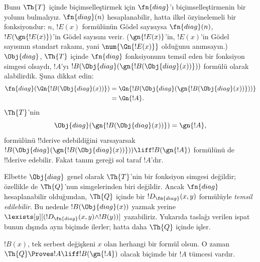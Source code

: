 \begin{explain}
Bunu $\Th{T}$ içinde biçimselleştirmek için $\fn{diag}$'ı
biçimselleştirmenin bir yolunu bulmalıyız. $\fn{diag}(n)$ hesaplanabilir,
hatta ilkel özyinelemeli bir fonksiyondur: $n$, $!E(x)$ formülünün G\"odel
sayısıysa $\fn{diag}(n)$, $!E(\gn{!E(x)})$'in G\"odel sayısını verir.
($\gn{!E(x)}$'in, $!E(x)$'in G\"odel sayısının standart rakamı, yani
$\num{\Gn{!E(x)}}$ olduğunu anımsayın.) $\Obj{diag}$, $\Th{T}$ içinde
$\fn{diag}$ fonksiyonunu temsil eden bir fonksiyon simgesi olsaydı, $!A$'yı
$!B(\Obj{diag}(\gn{!B(\Obj{diag}(x))}))$ formülü olarak alabilirdik. Şuna
dikkat edin:
\begin{align*}
\fn{diag}(\Gn{!B(\Obj{diag}(x))}) & = 
\Gn{!B(\Obj{diag}(\gn{!B(\Obj{diag}(x))}))} \\
& = \Gn{!A}.
\end{align*}
$\Th{T}$'nin
\[
\Obj{diag}(\gn{!B(\Obj{diag}(x))}) = \gn{!A},
\]
formülünü !!{derive} edebildiğini varsayarsak
$!B(\Obj{diag}(\gn{!B(\Obj{diag}(x))})) \liff !B(\gn{!A})$ formülünü de
!!{derive} edebilir. Fakat tanım gereği sol taraf $!A$'dır.

Elbette $\Obj{diag}$ genel olarak $\Th{T}$'nin bir fonksiyon simgesi değildir;
özellikle de $\Th{Q}$'nun simgelerinden biri değildir. Ancak $\fn{diag}$
hesaplanabilir olduğundan, $\Th{Q}$ içinde bir
$!D_{\fn{diag}}(x,y)$ formülüyle \emph{temsil edilebilir}. Bu nedenle
$!B(\Obj{diag}(x))$ yazmak yerine
$\lexists[y][(!D_{\fn{diag}}(x,y) \land !B(y))]$ yazabiliriz. Yukarıda
taslağı verilen ispat bunun dışında aynı biçimde ilerler; hatta daha
$\Th{Q}$ içinde işler.
\end{explain}

\begin{lem}
 $!B(x)$, tek serbest değişkeni $x$ olan herhangi
bir formül olsun. O zaman $\Th{Q} \Proves !A \liff !B(\gn{!A})$ olacak
biçimde bir $!A$ tümcesi vardır.
\end{lem}


